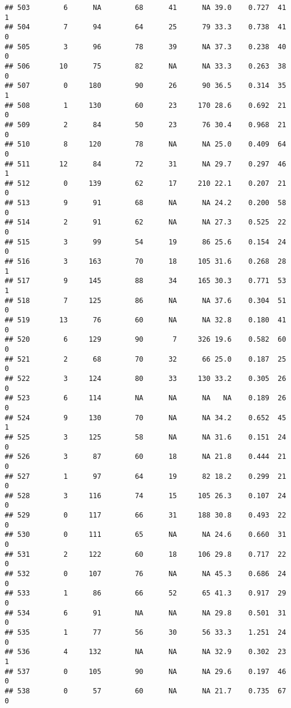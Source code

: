 \documentclass[
]{article}
\begin{document}
\begin{verbatim}
## 503        6      NA        68      41      NA 39.0    0.727  41    1
## 504        7      94        64      25      79 33.3    0.738  41    0
## 505        3      96        78      39      NA 37.3    0.238  40    0
## 506       10      75        82      NA      NA 33.3    0.263  38    0
## 507        0     180        90      26      90 36.5    0.314  35    1
## 508        1     130        60      23     170 28.6    0.692  21    0
## 509        2      84        50      23      76 30.4    0.968  21    0
## 510        8     120        78      NA      NA 25.0    0.409  64    0
## 511       12      84        72      31      NA 29.7    0.297  46    1
## 512        0     139        62      17     210 22.1    0.207  21    0
## 513        9      91        68      NA      NA 24.2    0.200  58    0
## 514        2      91        62      NA      NA 27.3    0.525  22    0
## 515        3      99        54      19      86 25.6    0.154  24    0
## 516        3     163        70      18     105 31.6    0.268  28    1
## 517        9     145        88      34     165 30.3    0.771  53    1
## 518        7     125        86      NA      NA 37.6    0.304  51    0
## 519       13      76        60      NA      NA 32.8    0.180  41    0
## 520        6     129        90       7     326 19.6    0.582  60    0
## 521        2      68        70      32      66 25.0    0.187  25    0
## 522        3     124        80      33     130 33.2    0.305  26    0
## 523        6     114        NA      NA      NA   NA    0.189  26    0
## 524        9     130        70      NA      NA 34.2    0.652  45    1
## 525        3     125        58      NA      NA 31.6    0.151  24    0
## 526        3      87        60      18      NA 21.8    0.444  21    0
## 527        1      97        64      19      82 18.2    0.299  21    0
## 528        3     116        74      15     105 26.3    0.107  24    0
## 529        0     117        66      31     188 30.8    0.493  22    0
## 530        0     111        65      NA      NA 24.6    0.660  31    0
## 531        2     122        60      18     106 29.8    0.717  22    0
## 532        0     107        76      NA      NA 45.3    0.686  24    0
## 533        1      86        66      52      65 41.3    0.917  29    0
## 534        6      91        NA      NA      NA 29.8    0.501  31    0
## 535        1      77        56      30      56 33.3    1.251  24    0
## 536        4     132        NA      NA      NA 32.9    0.302  23    1
## 537        0     105        90      NA      NA 29.6    0.197  46    0
## 538        0      57        60      NA      NA 21.7    0.735  67    0

\end{verbatim}
\end{document}

